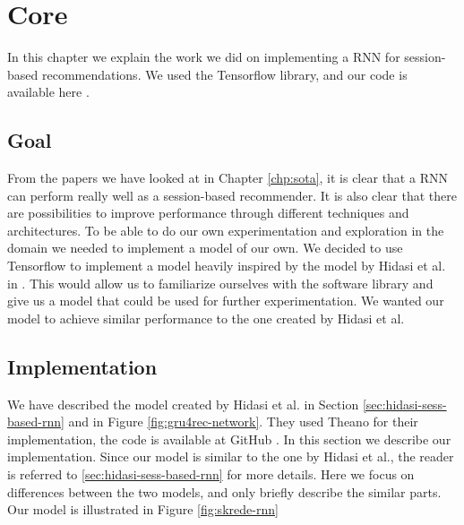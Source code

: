 \chapter{Core}
In this chapter we explain the work we did on implementing a RNN for session-based recommendations. We used the Tensorflow \cite{tensorflow2015-whitepaper} library, and our code is available here \cite{skrede:code}.

\section{Goal}
From the papers we have looked at in Chapter \ref{chp:sota}, it is clear that a RNN can perform really well as a session-based recommender. It is also clear that there are possibilities to improve performance through different techniques and architectures. To be able to do our own experimentation and exploration in the domain we needed to implement a model of our own. We decided to use Tensorflow to implement a model heavily inspired by the model by Hidasi et al. in \cite{DBLP:journals/corr/HidasiKBT15}. This would allow us to familiarize ourselves with the software library and give us a model that could be used for further experimentation. We wanted our model to achieve similar performance to the one created by Hidasi et al.

\section{Implementation}
We have described the model created by Hidasi et al. in Section \ref{sec:hidasi-sess-based-rnn} and in Figure \ref{fig:gru4rec-network}. They used Theano for their implementation, the code is available at GitHub \cite{hidasi:code}. In this section we describe our implementation. Since our model is similar to the one by Hidasi et al., the reader is referred to \ref{sec:hidasi-sess-based-rnn} for more details. Here we focus on differences between the two models, and only briefly describe the similar parts. Our model is illustrated in Figure \ref{fig:skrede-rnn}

